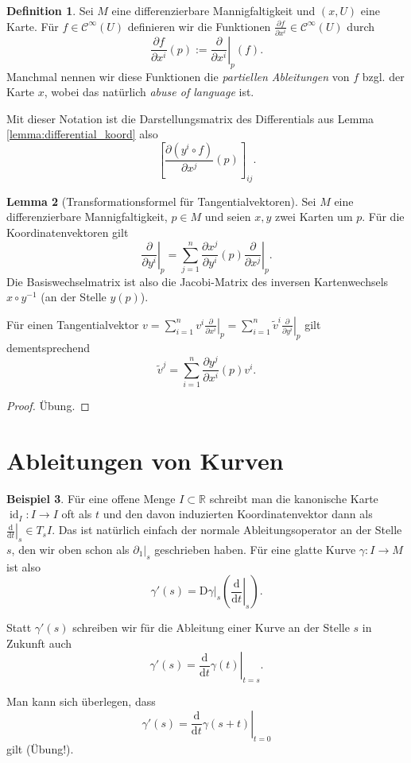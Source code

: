 \documentclass[a4paper]{scrreprt}
\numberwithin{equation}{chapter}
\newcommand{\D}{\mathrm{d}}
\newcommand{\DD}{\mathrm{D}}
\DeclareMathOperator{\id}{id}
\newcommand{\sC}{\mathcal{C}^{\infty}}
\theoremstyle{definition}
\newtheorem{defn}{Definition}[section]
\newtheorem{lemma}[defn]{Lemma}
\newtheorem{bsp}[defn]{Beispiel}
\newcommand{\bewUeb}{\begin{proof}Übung.\end{proof}}
\begin{document}
\begin{defn}
	Sei $M$ eine differenzierbare Mannigfaltigkeit und $(x,U)$ eine Karte. Für $f \in \sC(U)$ definieren wir die Funktionen $\frac{\partial f}{\partial x^i} \in \sC(U)$ durch
	\[\frac{\partial f}{\partial x^i}(p) := \left.\frac{\partial}{\partial x^i}\right|_p(f).\]
	Manchmal nennen wir diese Funktionen die \emph{partiellen Ableitungen} von $f$ bzgl. der Karte $x$, wobei das natürlich \emph{abuse of language} ist.
\end{defn}

Mit dieser Notation ist die Darstellungsmatrix des Differentials aus Lemma \ref{lemma:differential_koord} also
\[\left[\frac{\partial(y^i \circ f)}{\partial x^j}(p)\right]_{ij}.\]

\begin{lemma}[Transformationsformel für Tangentialvektoren]
	Sei $M$ eine differenzierbare Mannigfaltigkeit, $p\in M$ und seien $x, y$ zwei Karten um $p$. Für die Koordinatenvektoren gilt
	\[\left.\frac{\partial}{\partial y^i}\right|_p = \sum_{j=1}^n \frac{\partial x^j}{\partial y^i}(p) \left.\frac{\partial}{\partial x^j}\right|_p.\]
	Die Basiswechselmatrix ist also die Jacobi-Matrix des inversen Kartenwechsels $x \circ y^{-1}$ (an der Stelle $y(p)$).

	Für einen Tangentialvektor $v = \sum_{i=1}^n v^i \left.\frac{\partial}{\partial x^i}\right|_p = \sum_{i=1}^n \tilde v^i \left.\frac{\partial}{\partial y^i}\right|_p$ gilt dementsprechend
	\[\tilde v^j = \sum_{i=1}^n \frac{\partial y^j}{\partial x^i}(p) v^i.\]

	\bewUeb
\end{lemma}


\section{Ableitungen von Kurven}
\begin{bsp}
	Für eine offene Menge $I\subset\mathbb R$ schreibt man die kanonische Karte $\id_I\colon I \to I$ oft als $t$ und den davon induzierten Koordinatenvektor dann als $\left.\frac{\D}{\D t}\right|_s \in T_sI$. Das ist natürlich einfach der normale Ableitungsoperator an der Stelle $s$, den wir oben schon als $\left.\partial_1\right|_s$ geschrieben haben. Für eine glatte Kurve $\gamma\colon I \to M$ ist also
	\[\gamma'(s) = \left.\DD\gamma\right|_s \left(\left.\frac{\D}{\D t}\right|_s\right).\]

	Statt $\gamma'(s)$ schreiben wir für die Ableitung einer Kurve an der Stelle $s$ in Zukunft auch
	\[\gamma'(s) = \left.\frac{\D}{\D t}\gamma(t)\right|_{t = s}.\]

	Man kann sich überlegen, dass
	\[\gamma'(s) = \left.\frac{\D}{\D t}\gamma(s + t)\right|_{t = 0}\]
	gilt (Übung!).
\end{bsp}
\end{document}
